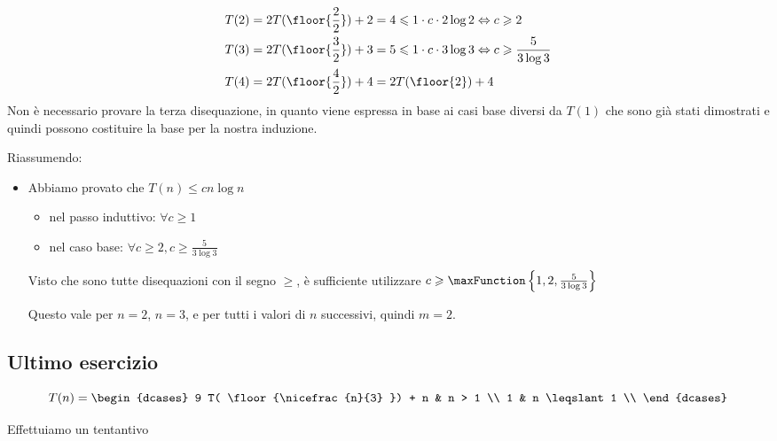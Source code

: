 \begin{itemize}
	\begin{align*}
		T(2) &= 2T(\floor{\frac{2}{2}}) + 2 = 4 \leqslant 1 \cdot c \cdot 2 \log 2 \Leftrightarrow c \geqslant 2\\
		T(3) &= 2T(\floor{\frac{3}{2}}) + 3 = 5 \leqslant 1 \cdot c \cdot 3 \log 3 \Leftrightarrow c \geqslant \frac{5}{3 \log 3}\\
		T(4) &= 2T(\floor{\frac{4}{2}}) + 4 = 2T(\floor{2}) + 4
	\end{align*}
	Non è necessario provare la terza disequazione, in quanto viene espressa in base ai casi base diversi da \(T(1)\) che sono già stati dimostrati e quindi possono costituire la base per la nostra induzione.
\end{itemize}

Riassumendo:
\begin{itemize}
	\item[] Abbiamo provato che \(T(n) \leqslant cn \log n\)
	\begin{itemize}[label=\textbullet]
		\item nel passo induttivo: \(\forall c \geqslant 1\)
		\item nel caso base: \(\forall c \geqslant 2, c \geqslant \frac{5}{3\log 3}\)
	\end{itemize}
	Visto che sono tutte disequazioni con il segno \(\geqslant\), è sufficiente utilizzare \(c \geqslant \maxFunction\left\{ 1,2,\frac{5}{3 \log 3} \right\}\)

	Questo vale per \(n=2\), \(n=3\), e per tutti i valori di \(n\) successivi, quindi \(m = 2\).
\end{itemize}

\subsection*{Ultimo esercizio}

\[
	T(n) =
	\begin{dcases}
	9 T( \floor{\nicefrac{n}{3} }) + n & n > 1 \\
	1 & n \leqslant 1 \\
	\end{dcases}
\]

Effettuiamo un tentantivo 

